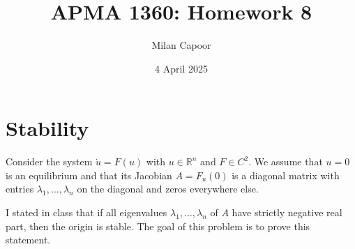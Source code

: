 \documentclass[12pt]{article}
\title{APMA 1360: Homework 8}
\author{Milan Capoor}
\date{4 April 2025}
\newcommand{\R}{\mathbb{R}}
\begin{document}
\maketitle


\section{Stability}

Consider the system $\dot{u}=F(u)$ with $u\in\R^n$ and $F\in C^2$. We assume that $u=0$ is an equilibrium and that its Jacobian $A=F_u(0)$ is a diagonal matrix with entries $\lambda_1,\ldots,\lambda_n$ on the diagonal and zeros everywhere else.

I stated in class that if all eigenvalues $\lambda_1,\ldots,\lambda_n$ of $A$ have strictly negative real part, then the origin is stable. The goal of this problem is to prove this statement.
\end{document}
